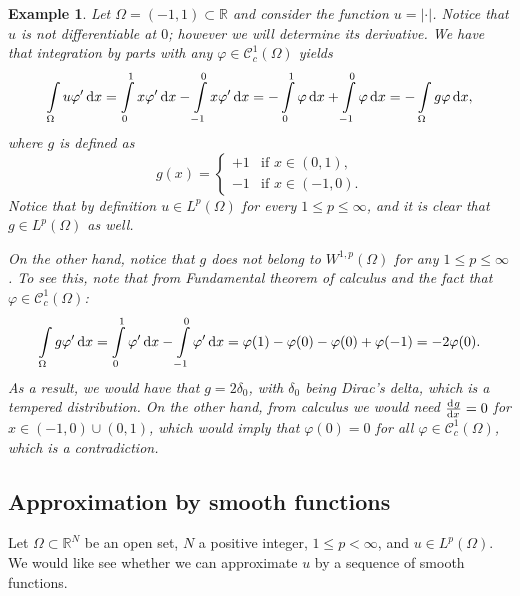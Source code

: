 \documentclass[a4paper,doc,11pt]{article}
\newtheorem{example}[theorem]{Example}
\newcommand{\R}{\mathbb{R}}
\newcommand{\CC}{\mathcal{C}}
\begin{document}
\begin{example}
    Let \(\Omega = (-1,1) \subset \R\) and consider the function \( u = |\cdot|\). Notice that \(u\) is not differentiable at \(0\); however we will determine its derivative. We have that integration by parts with any \(\varphi \in \CC_c^1 (\Omega)\) yields
    \begin{align*}
        \int\limits_\Omega u \varphi' \dif x
        =
        \int\limits_{0}^1 x \varphi'  \dif x
        -
        \int\limits_{-1}^0 x \varphi'  \dif x
        = 
        -\int\limits_{0}^1 \varphi  \dif x
        +
        \int\limits_{-1}^0 \varphi  \dif x
        =
        -\int\limits_\Omega g \varphi \dif x,
    \end{align*}
    where \(g\) is defined as
    \[
        g(x) = 
        \begin{cases}
            +1 & \text{if } x\in (0,1),
            \\
            -1 & \text{if } x\in (-1,0).
        \end{cases}
    \]
    Notice that by definition \(u\in L^p(\Omega)\) for every \(1 \leq p\leq \infty \), and it is clear that \(g \in L^p (\Omega)\) as well. 
    
    On the other hand, notice that \(g\) does \emph{not} belong to \( W^{1,p}(\Omega)\) for any \(1\leq p \leq \infty\). To see this, note that from Fundamental theorem of calculus and the fact that \(\varphi \in \CC_c^1 (\Omega)\):
    \[
        \int\limits_\Omega g \varphi' \dif x
        =
        \int\limits_0^1 \varphi' \dif x - \int\limits_{-1}^0 \varphi' \dif x
        =
        \varphi(1) - \varphi(0)  - \varphi(0) + \varphi(-1) = -2 \varphi(0).
    \]
    As a result, we would have that \( g = 2 \delta_0\), with \(\delta_0\) being Dirac's delta, which is a tempered distribution. On the other hand, from calculus we would need \(\od{g}{x} = 0\) for \( x\in (-1,0)\cup (0,1)\), which would imply that \( \varphi(0) = 0\) for all \(\varphi \in \CC_c^1 (\Omega)\), which is a contradiction.
\end{example}


\subsection{Approximation by smooth functions}

Let \(\Omega \subset \R^N\) be an open set, \(N\) a positive integer, \( 1\leq p < \infty\), and \( u \in L^p (\Omega)\). We would like see whether we can approximate \(u\) by a sequence of smooth functions.
\end{document}
